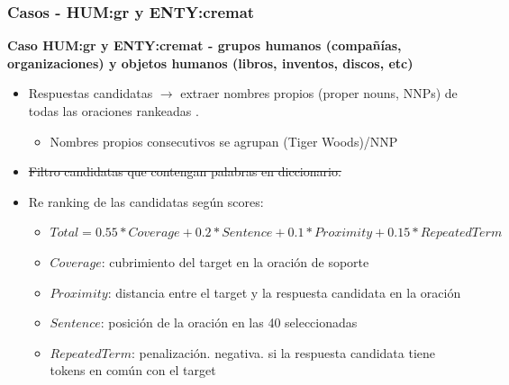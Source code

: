 \begin{frame}
\frametitle{Casos - HUM:gr y ENTY:cremat}
\textbf{Caso HUM:gr y ENTY:cremat - grupos humanos (compañías, organizaciones) y objetos humanos (libros, inventos, discos, etc)} \newline
  \begin{itemize}
    \item Respuestas candidatas $\rightarrow$ extraer nombres propios (proper nouns, NNPs) de todas las oraciones rankeadas .
      \begin{itemize}
        \item Nombres propios consecutivos se agrupan (Tiger Woods)/NNP 
    \end{itemize}
    \item \st{Filtro candidatas que contengan palabras en diccionario.} \footnotemark
    \item Re ranking de las candidatas según scores: 
    \begin{itemize}
        \item \tiny{$Total = 0.55 * Coverage + 0.2 * Sentence + 0.1 * Proximity + 0.15 * RepeatedTerm$}
        \item \tiny{$Coverage$: cubrimiento del target en la oración de soporte}
        \item \tiny{$Proximity$: distancia entre el target y la respuesta candidata en la oración}
        \item \tiny{$Sentence$: posición de la oración en las 40 seleccionadas}
        \item \tiny{$RepeatedTerm$: penalización. negativa. si la respuesta candidata tiene tokens en común con el target}
    \end{itemize}
  \end{itemize}

\end{frame}

